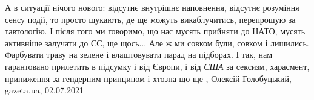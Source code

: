 А в ситуації нічого нового: відсутнє внутрішнє наповнення, відсутнє розуміння
сенсу події, то просто шукають, де ще можуть викаблучитись, перепрошую за
тавтологію.  І після того ми говоримо, що нас мусять прийняти до НАТО, мусять
активніше залучати до ЄС, ще щось... Але ж ми совком були, совком і лишились.
Фарбувати траву на зелене і влаштовувати парад на підборах.  І так, нам
гарантовано прилетить в підсумку і від Європи, і від \emph{США} за сексизм,
харасмент, приниження за гендерним принципом і хтозна-що ще
, 
Олексій Голобуцький, gazeta.ua, 02.07.2021
